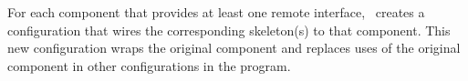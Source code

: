For each component that provides at least one remote interface,
\Sprocket\ creates a configuration that wires the corresponding
skeleton(s) to that component. This new configuration wraps the original
component and replaces uses of the original component in other
configurations in the program.




